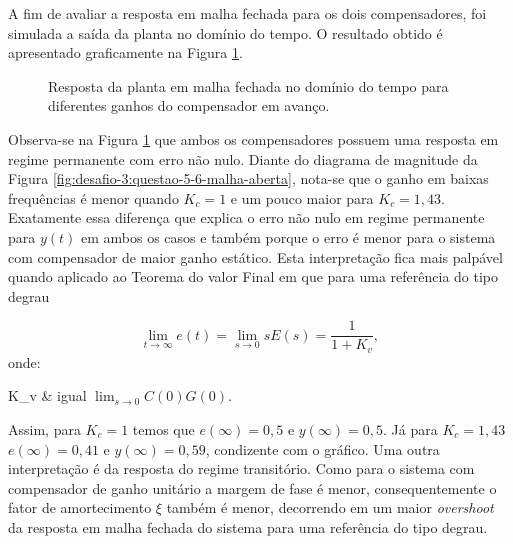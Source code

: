 A fim de avaliar a resposta em malha fechada para os dois compensadores, foi
simulada a saída da planta no domínio do tempo. O resultado obtido é apresentado
graficamente na Figura \ref{fig:desafio-3:questao-7-dominio-do-tempo}.

\begin{figure}[ht!]
    \caption{Resposta da planta em malha fechada no domínio do tempo para
    diferentes ganhos do compensador em avanço.}
    \vspace{-10pt}
    \hspace{-30pt}
    \label{fig:desafio-3:questao-7-dominio-do-tempo}
    \begin{minipage}{\linewidth}
        
    \end{minipage}
\end{figure}

Observa-se na Figura \ref{fig:desafio-3:questao-7-dominio-do-tempo} que ambos os
compensadores possuem uma resposta em regime permanente com erro não nulo.
Diante do diagrama de magnitude da Figura
\ref{fig:desafio-3:questao-5-6-malha-aberta}, nota-se que o ganho em baixas
frequências é menor quando $K_c = 1$ e um pouco maior para $K_c = 1,43$.
Exatamente essa diferença que explica o erro não nulo em regime permanente para
$y(t)$ em ambos os casos e também porque o erro é menor para o sistema com
compensador de maior ganho estático. Esta interpretação fica mais palpável
quando aplicado ao Teorema do valor Final em que para uma referência do tipo
degrau

\begin{equation}
    \label{eq:desafio3-teorema-do-valor-final}
    \lim_{t \rightarrow \infty }e(t)=\lim_{s \rightarrow 0 }sE(s)=\frac{1}{1+K_v},
\end{equation}
onde:

\begin{conditions*}
    K_v & igual $\lim_{s \rightarrow 0 }C(0)G(0)$.
\end{conditions*}

Assim, para $K_c = 1$ temos que $e(\infty) = 0,5$ e $y(\infty) = 0,5$. Já para
$K_c = 1,43$ $e(\infty) = 0,41$ e $y(\infty) = 0,59$, condizente com o gráfico.
Uma outra interpretação é da resposta do regime transitório. Como para o sistema
com compensador de ganho unitário a margem de fase é menor, consequentemente
o fator de amortecimento $\xi$ também é menor, decorrendo em um maior
\textit{overshoot} da resposta em malha fechada do sistema para uma referência
do tipo degrau.

